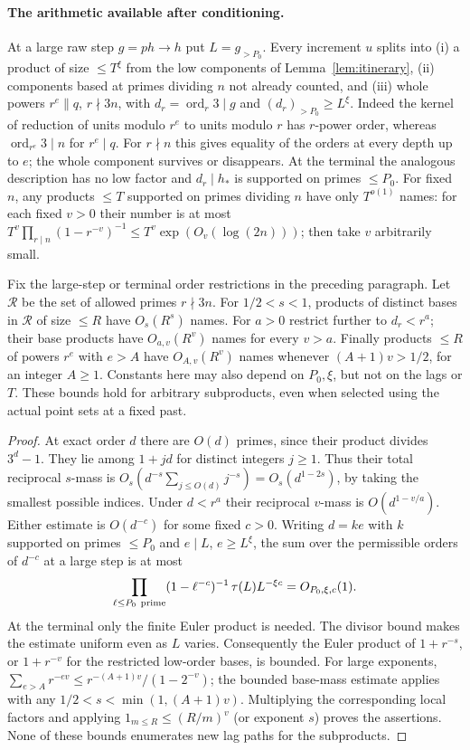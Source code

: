\paragraph{The arithmetic available after conditioning.}
At a large raw step $g=ph\to h$ put $L=g_{>P_0}$.
Every increment $u$ splits into (i) a product of size $\le T^\xi$
from the low components of Lemma~\ref{lem:itinerary}, (ii) components
based at primes dividing $n$ not already counted, and (iii) whole
powers $r^e\parallel q$, $r\nmid 3n$, with
$d_r=\operatorname{ord}_r3\mid g$ and $(d_r)_{>P_0}\ge L^\xi$.
Indeed the kernel of reduction of units modulo $r^e$ to units
modulo $r$ has $r$-power order, whereas
$\operatorname{ord}_{r^e}3\mid n$ for $r^e\mid q$. For $r\nmid n$
this gives equality of the orders at every depth up to $e$; the
whole component survives or disappears. At the terminal the analogous
description has no low factor and $d_r\mid h_*$ is supported on
primes $\le P_0$. For fixed $n$, any products $\le T$ supported on
primes dividing $n$ have only $T^{o(1)}$ names: for each fixed
$v>0$ their number is at most
$T^v\prod_{r\mid n}(1-r^{-v})^{-1}
 \le T^v\exp(O_v(\log(2n)))$; then take $v$ arbitrarily small.

\begin{lemma}\label{lem:itinerary-names}
Fix the large-step or terminal order restrictions in the preceding
paragraph. Let $\mathcal R$ be the set of allowed primes $r\nmid3n$.
For $1/2<s<1$, products of distinct bases in $\mathcal R$ of size
$\le R$ have $O_s(R^s)$ names. For $a>0$ restrict further to
$d_r<r^a$; their base products have $O_{a,v}(R^v)$ names for
every $v>a$. Finally products $\le R$ of powers $r^e$ with $e>A$
have $O_{A,v}(R^v)$ names whenever $(A+1)v>1/2$, for an integer
$A\ge1$. Constants here may also depend on $P_0,\xi$, but not on
the lags or $T$. These bounds hold for arbitrary subproducts, even
when selected using the actual point sets at a fixed past.
\end{lemma}
\begin{proof}
At exact order $d$ there are $O(d)$ primes, since their product
divides $3^d-1$. They lie among $1+jd$ for distinct integers $j\ge1$.
Thus their total reciprocal $s$-mass is
$O_s(d^{-s}\sum_{j\le O(d)} j^{-s})=O_s(d^{1-2s})$,
by taking the smallest possible indices. Under $d<r^a$ their
reciprocal $v$-mass is $O(d^{1-v/a})$. Either estimate is
$O(d^{-c})$ for some fixed $c>0$.
Writing $d=ke$ with $k$ supported on primes $\le P_0$ and
$e\mid L$, $e\ge L^\xi$, the sum over the permissible orders of
$d^{-c}$ at a large step is at most
\[
 \prod_{\ell\le P_0\ {\rm prime}}(1-\ell^{-c})^{-1}
 \,\tau(L)L^{-\xi c}=O_{P_0,\xi,c}(1).
\]
At the terminal only the finite Euler product is needed. The
divisor bound makes the estimate uniform even as $L$ varies.
Consequently the Euler product of $1+r^{-s}$, or $1+r^{-v}$ for
the restricted low-order bases, is bounded. For large exponents,
$\sum_{e>A}r^{-ev}\le r^{-(A+1)v}/(1-2^{-v})$; the bounded
base-mass estimate applies with any
$1/2<s<\min(1,(A+1)v)$. Multiplying the corresponding local
factors and applying $1_{m\le R}\le(R/m)^v$ (or exponent $s$)
proves the assertions. None of these bounds enumerates new lag
paths for the subproducts.
\end{proof}

